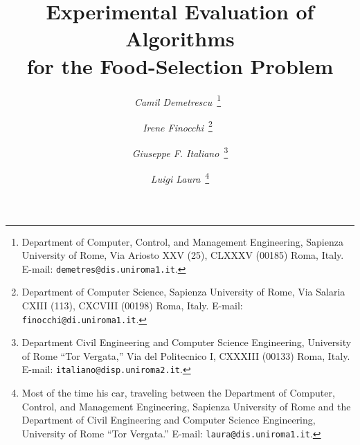 \documentclass[twocolumn,10pt]{article}
\begin{document}
\title{{\Large{\bf Experimental Evaluation of Algorithms}\\ for the Food-Selection Problem}}

\author{\addtocounter{footnote}{0}
{\em Camil Demetrescu}~\thanks{Department of Computer, Control, and Management Engineering,
Sapienza University of Rome, Via Ariosto
XXV (25), CLXXXV (00185) Roma, Italy.  E-mail:
{\tt demetres}{\tt @dis.uniroma1.it}.}~\\ \and 
\addtocounter{footnote}{+0}
{\em Irene
Finocchi}~\thanks{Department of Computer Science,
Sapienza University of Rome, Via Salaria
CXIII (113), CXCVIII (00198) Roma, Italy.  E-mail:
{\tt finocchi@di.uniroma1.it}.}~\\
\and {\em Giuseppe F. Italiano}~\thanks{Department Civil Engineering and Computer Science Engineering,
University of Rome ``Tor Vergata,'' Via del Politecnico
I, CXXXIII (00133) Roma, Italy.  E-mail:
{\tt italiano@disp.uniroma2.it}.}
\and {\em Luigi Laura}~\thanks{Most of the time his car, traveling between the Department of Computer, Control, and Management Engineering,
Sapienza University of Rome and the Department of Civil Engineering and Computer Science Engineering,
University of Rome ``Tor Vergata.''  E-mail:
{\tt laura@dis.uniroma1.it}.}
}

\date{}

\maketitle
\end{document}
